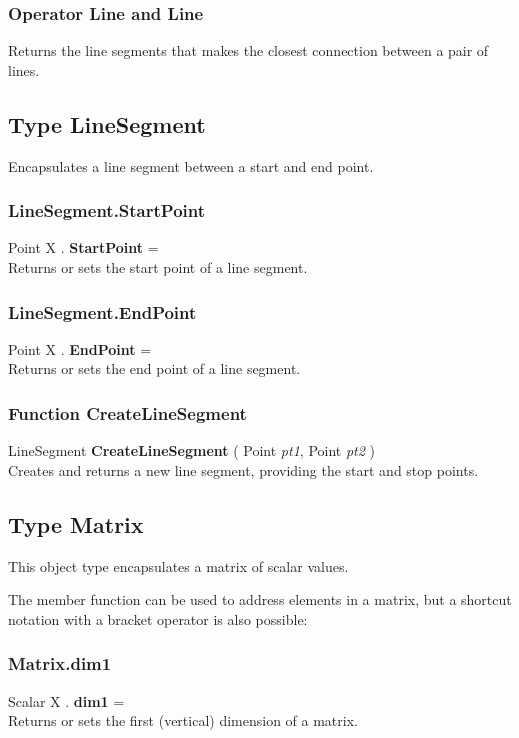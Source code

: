 \subsubsection{Operator Line  and  Line \label{O:Line and Line}}
Returns the line segments that makes the closest connection between a pair of lines.

\subsection{Type LineSegment \label{T:LineSegment}}
Encapsulates a line segment between a start and end point.

\subsubsection{LineSegment.StartPoint \label{F:LineSegment:StartPoint}}
Point X . \textbf{StartPoint} = \\
Returns or sets the start point of a line segment.

\subsubsection{LineSegment.EndPoint \label{F:LineSegment:EndPoint}}
Point X . \textbf{EndPoint} = \\
Returns or sets the end point of a line segment.

\subsubsection{Function CreateLineSegment \label{F:CreateLineSegment}}
LineSegment \textbf{CreateLineSegment} ( Point \textit{pt1}, Point \textit{pt2} ) \\
Creates and returns a new line segment, providing the start and stop points.

\subsection{Type Matrix \label{T:Matrix}}
This object type encapsulates a matrix of scalar values.

The member function  can be used to address elements in a matrix, but a shortcut notation with a bracket operator is also possible: \\

\subsubsection{Matrix.dim1 \label{F:Matrix:dim1}}
Scalar X . \textbf{dim1} = \\
Returns or sets the first (vertical) dimension of a matrix.

